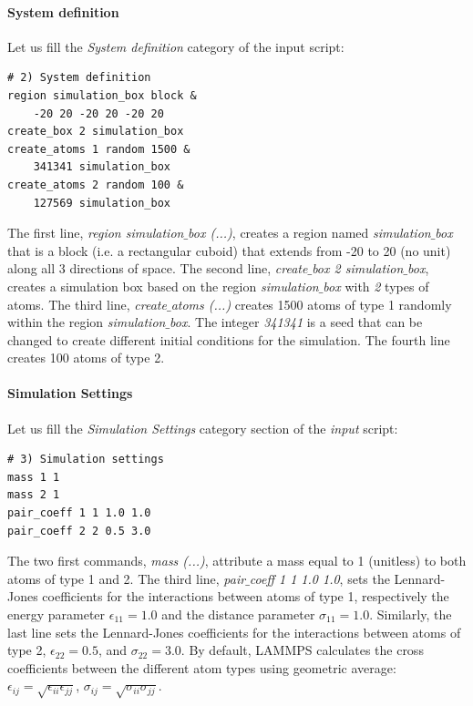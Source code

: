 \documentclass[9pt,tutorial]{livecoms}
\begin{document}
\paragraph{System definition}
Let us fill the \textit{System definition} category of the input script:
{\normalsize \begin{verbatim}
# 2) System definition
region simulation_box block &
    -20 20 -20 20 -20 20
create_box 2 simulation_box
create_atoms 1 random 1500 &
    341341 simulation_box
create_atoms 2 random 100 &
    127569 simulation_box
\end{verbatim}}
\noindent The first line, \textit{region simulation$\_$box (...)}, creates a region named \textit{simulation$\_$box} that is a block (i.e. a rectangular cuboid) that extends from -20 to 20 (no unit) along all 3 directions of space. The second line, \textit{create$\_$box 2 simulation$\_$box}, creates a simulation box based on the region \textit{simulation$\_$box} with \textit{2} types of atoms. The third line, \textit{create$\_$atoms (...)} creates 1500 atoms of type 1 randomly within the region \textit{simulation$\_$box}. The integer \textit{341341} is a seed that can be changed to create different initial conditions for the simulation. The fourth line creates 100 atoms of type 2.

\paragraph{Simulation Settings}
Let us fill the \textit{Simulation Settings} category section of the \textit{input} script:
{\normalsize \begin{verbatim}
# 3) Simulation settings
mass 1 1
mass 2 1
pair_coeff 1 1 1.0 1.0
pair_coeff 2 2 0.5 3.0
\end{verbatim}}
The two first commands, \textit{mass (...)}, attribute a mass equal to 1 (unitless) to both atoms of type 1 and 2. The third line, \textit{pair$\_$coeff 1 1 1.0 1.0}, sets the Lennard-Jones coefficients for the interactions between atoms of type 1, respectively the energy parameter $\epsilon_{11} = 1.0$ and the distance parameter $\sigma_{11} = 1.0$. Similarly, the last line sets the Lennard-Jones coefficients for the interactions between atoms of type 2, $\epsilon_{22} = 0.5$, and $\sigma_{22} = 3.0$. By default, LAMMPS calculates the cross coefficients between the different atom types using geometric average: $\epsilon_{ij} = \sqrt{\epsilon_{ii} \epsilon_{jj}}$, $\sigma_{ij} = \sqrt{\sigma_{ii} \sigma_{jj}}$. 
\end{document}
